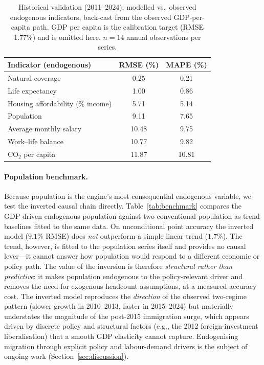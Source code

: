 \documentclass[urbansci,article,submit,pdftex,moreauthors]{Definitions/mdpi}
\begin{document}
\begin{table}[H]
\caption{Historical validation (2011--2024): modelled vs.\ observed endogenous
indicators, back-cast from the observed GDP-per-capita path. GDP per capita is the
calibration target (RMSE 1.77\%) and is omitted here. $n=14$ annual observations
per series.}
\label{tab:validation}
\begin{tabularx}{\textwidth}{Xcc}
\toprule
\textbf{Indicator (endogenous)} & \textbf{RMSE (\%)} & \textbf{MAPE (\%)} \\
\midrule
Natural coverage                  & 0.25  & 0.21 \\
Life expectancy                   & 1.00  & 0.86 \\
Housing affordability (\% income) & 5.71  & 5.14 \\
Population                        & 9.11  & 7.65 \\
Average monthly salary            & 10.48 & 9.75 \\
Work--life balance                & 10.77 & 9.82 \\
CO$_2$ per capita                 & 11.87 & 10.81 \\
\bottomrule
\end{tabularx}
\end{table}

\paragraph{Population benchmark.}
Because population is the engine's most consequential endogenous variable, we test
the inverted causal chain directly. Table~\ref{tab:benchmark} compares the
GDP-driven endogenous population against two conventional population-as-trend
baselines fitted to the same data. On unconditional point accuracy the inverted
model ($9.1\%$ RMSE) does \emph{not} outperform a simple linear trend ($1.7\%$).
The trend, however, is fitted to the population series itself and provides no
causal lever---it cannot answer how population would respond to a different
economic or policy path. The value of the inversion is therefore \emph{structural
rather than predictive}: it makes population endogenous to the policy-relevant
driver and removes the need for exogenous headcount assumptions, at a measured
accuracy cost. The inverted model reproduces the \emph{direction} of the observed
two-regime pattern (slower growth in 2010--2013, faster in 2015--2024) but
materially understates the magnitude of the post-2015 immigration surge, which
appears driven by discrete policy and structural factors (e.g., the 2012
foreign-investment liberalisation) that a smooth GDP elasticity cannot capture.
Endogenising migration through explicit policy and labour-demand drivers is the
subject of ongoing work (Section~\ref{sec:discussion}).
\end{document}
